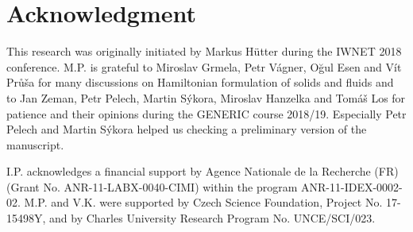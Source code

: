 \documentclass[
10pt, %
a4paper, %
oneside, %
headinclude,footinclude, %
BCOR5mm, %
]{scrartcl}
\begin{document}
\section*{Acknowledgment}
This research was originally initiated by Markus H{\" u}tter during the IWNET 
2018 conference. M.P. is grateful to Miroslav Grmela, Petr Vágner, O{\u g}ul 
Esen and V{\' i}t Pr{\r u}{\v s}a for many discussions on Hamiltonian 
formulation of solids and fluids and to Jan Zeman, Petr Pelech, Martin Sýkora, 
Miroslav Hanzelka and Tomáš Los for patience and their opinions during the 
GENERIC course 2018/19. Especially Petr Pelech and Martin S{\' y}kora helped us 
checking a preliminary version of the manuscript.

I.P. acknowledges a financial support by Agence Nationale de la Recherche (FR) (Grant No. ANR-11-LABX-0040-CIMI) within the program ANR-11-IDEX-0002-02. M.P. and V.K. were supported by Czech Science Foundation, Project No. 17-15498Y, and by Charles University Research Program No. UNCE/SCI/023. 


\printbibliography

%



\appendix
\end{document}
